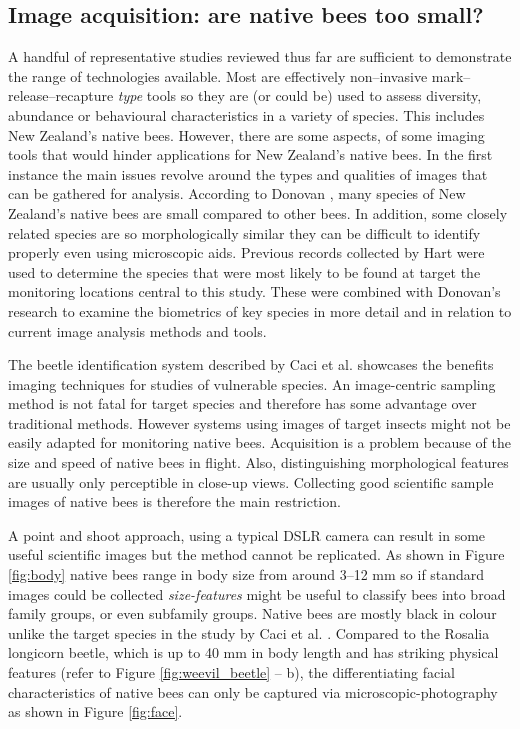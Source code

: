 \subsection{Image acquisition: are native bees too small?}\label{sec:image-acquisition:-are-native-bees-too-small?}
A handful of representative studies reviewed thus far are sufficient to demonstrate the range of technologies available. Most are effectively non--invasive mark--release--recapture \emph{type} tools so they are (or could be) used to assess diversity, abundance or behavioural characteristics in a variety of species. This includes New Zealand's native bees. However, there are some aspects, of some imaging tools that would hinder applications for New Zealand's native bees. In the first instance the main issues revolve around the types and qualities of images that can be gathered for analysis. According to Donovan \cite{Donovan2007}, many species of New Zealand's native bees are small compared to other bees. In addition, some closely related species are so morphologically similar they can be difficult to identify properly even using microscopic aids. Previous records collected by Hart \cite{Hart2007} were used to determine the species that were most likely to be found at target the monitoring locations central to this study. These were combined with Donovan's \cite{Donovan2007} research to examine the biometrics of key species in more detail and in relation to current image analysis methods and tools.

The beetle identification system described by Caci et al. \cite{Caci2013} showcases the benefits imaging techniques for studies of vulnerable species. An {image-centric} sampling method is not fatal for target species and therefore has some advantage over traditional methods. However systems using images of target insects might not be easily adapted for monitoring native bees. Acquisition is a problem because of the size and speed of native bees in flight. Also, distinguishing morphological features are usually only perceptible in close-up views. Collecting good scientific sample images of native bees is therefore the main restriction.

A point and shoot approach, using a typical \ac{DSLR} camera can result in some useful scientific images but the method cannot be replicated. As shown in Figure \ref{fig:body} native bees range in body size from around 3--12 mm so if standard images could be collected \emph{size-features} might be useful to classify bees into broad family groups, or even subfamily groups. Native bees are mostly black in colour unlike the target species in the study by Caci et al. \cite{Caci2013}. Compared to the Rosalia longicorn beetle, which is up to 40 mm in body length and has striking physical features (refer to Figure \ref{fig:weevil_beetle} -- b), the differentiating facial characteristics of native bees can only be captured via microscopic-photography as shown in Figure \ref{fig:face}.

